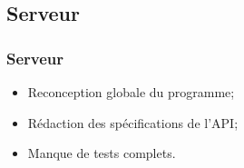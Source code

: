 \subsection{Serveur}
	\begin{frame}
		\frametitle{Serveur}
        \begin{itemize}
            \item Reconception globale du programme; \newline
            \item Rédaction des spécifications de l'API; \newline
            \item Manque de tests complets. \newline
        \end{itemize}
	\end{frame}


